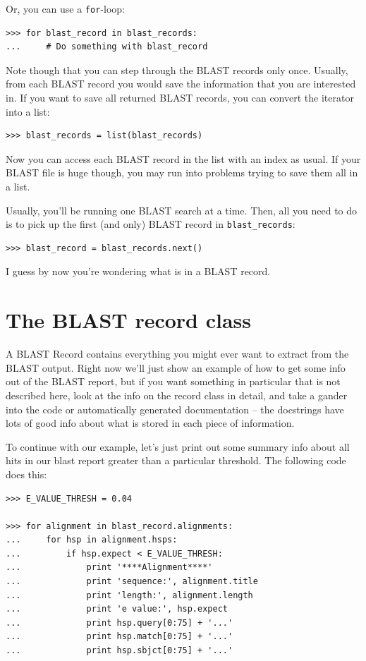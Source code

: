 \documentclass{report}
\begin{document}
Or, you can use a \verb|for|-loop:
\begin{verbatim}
>>> for blast_record in blast_records:
...     # Do something with blast_record
\end{verbatim}

Note though that you can step through the BLAST records only once.
Usually, from each BLAST record you would save the information that
you are interested in. If you want to save all returned BLAST records,
you can convert the iterator into a list:
\begin{verbatim}
>>> blast_records = list(blast_records)
\end{verbatim}
Now you can access each BLAST record in the list with an index as usual.
If your BLAST file is huge though, you may run into problems trying to
save them all in a list.

Usually, you'll be running one BLAST search at a time. Then, all you need
to do is to pick up the first (and only) BLAST record in \verb|blast_records|:
\begin{verbatim}
>>> blast_record = blast_records.next()
\end{verbatim}

I guess by now you're wondering what is in a BLAST record.

\section{The BLAST record class}

A BLAST Record contains everything you might ever want to extract from the
BLAST output. Right now we'll just show
an example of how to get some info out of the BLAST report, but if you
want something in particular that is not described here, look at the
info on the record class in detail, and take a gander into the code or
automatically generated documentation -- the docstrings have lots of
good info about what is stored in each piece of information.

To continue with our example, let's just print out some summary info
about all hits in our blast report greater than a particular
threshold. The following code does this:

\begin{verbatim}
>>> E_VALUE_THRESH = 0.04

>>> for alignment in blast_record.alignments:
...     for hsp in alignment.hsps:
...         if hsp.expect < E_VALUE_THRESH:
...             print '****Alignment****'
...             print 'sequence:', alignment.title
...             print 'length:', alignment.length
...             print 'e value:', hsp.expect
...             print hsp.query[0:75] + '...'
...             print hsp.match[0:75] + '...'
...             print hsp.sbjct[0:75] + '...'
\end{verbatim}
\end{document}
